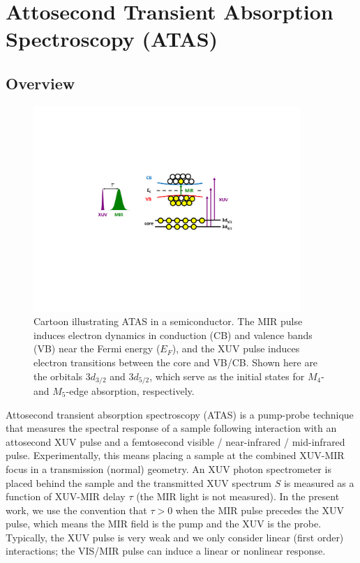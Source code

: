 \section{Attosecond Transient Absorption Spectroscopy (ATAS)}
\label{sec:ATAS}

\subsection{Overview}

\begin{figure}
	\centering
	\includegraphics[width=0.9\textwidth]{figures/chap1/ATAS_cartoon.pdf}
	\caption{Cartoon illustrating ATAS in a semiconductor. The MIR pulse induces electron dynamics in conduction (CB) and valence bands (VB) near the Fermi energy ($E_F$), and the XUV pulse induces electron transitions between the core and VB/CB. Shown here are the orbitals $3d_{3/2}$ and $3d_{5/2}$, which serve as the initial states for $M_4$- and $M_5$-edge absorption, respectively.}
	\label{fig:ATAS_cartoon}
\end{figure}


Attosecond transient absorption spectroscopy (ATAS) is a pump-probe technique that measures the spectral response of a sample following interaction with an attosecond XUV pulse and a femtosecond visible / near-infrared / mid-infrared pulse. Experimentally, this means placing a sample at the combined XUV-MIR focus in a transmission (normal) geometry. An XUV photon spectrometer is placed behind the sample and the transmitted XUV spectrum $S$ is measured as a function of XUV-MIR delay $\tau$ (the MIR light is not measured). In the present work, we use the convention that $\tau>0$ when the MIR pulse precedes the XUV pulse, which means the MIR field is the pump and the XUV is the probe. Typically, the XUV pulse is very weak and we only consider linear (first order) interactions; the VIS/MIR pulse can induce a linear or nonlinear response.

